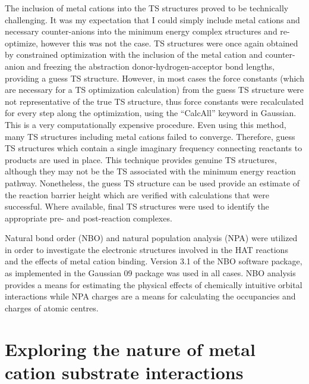 The inclusion of metal cations into the TS structures proved to be technically
challenging. It was my expectation that I could simply include metal cations and
necessary counter-anions into the minimum energy complex structures and
re-optimize, however this was not the case. TS structures were once again
obtained by constrained optimization with the inclusion of the metal cation and
counter-anion and freezing the abstraction donor-hydrogen-acceptor bond lengths,
providing a guess TS structure. However, in most cases the force constants
(which are necessary for a TS optimization calculation) from the guess TS
structure were not representative of the true TS structure, thus force constants
were recalculated for every step along the optimization, using the ``CalcAll''
keyword in Gaussian. This is a very computationally expensive procedure. Even
using this method, many TS structures including metal cations failed to
converge. Therefore, guess TS structures which contain a single imaginary
frequency connecting reactants to products are used in place. This technique
provides genuine TS structures, although they may not be the TS associated with
the minimum energy reaction pathway. Nonetheless, the guess TS structure can be
used provide an estimate of the reaction barrier height which are verified with
calculations that were successful. Where available, final TS structures were
used to identify the appropriate pre- and post-reaction complexes.

Natural bond order (NBO) and natural population analysis (NPA) were utilized in
order to investigate the electronic structures involved in the HAT reactions and
the effects of metal cation binding.\cite{Reed1983, Reed1985, Glendening2012}
Version 3.1 of the NBO software package,\cite{NBO3} as implemented in the
Gaussian 09 package was used in all cases.\cite{Frisch2009} NBO analysis
provides a means for estimating the physical effects of chemically intuitive
orbital interactions while NPA charges are a means for calculating the
occupancies and charges of atomic centres.\cite{Landis2014, Weinhold2016}

\section{Exploring the nature of metal cation substrate interactions}

